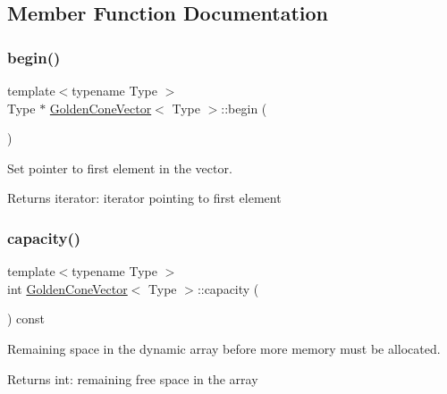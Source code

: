 \subsection{Member Function Documentation}
\mbox{\label{class_golden_cone_vector_aeb123e6db4c356b66754ee6e2e813935}} 
\subsubsection{\texorpdfstring{begin()}{begin()}}
{\footnotesize\ttfamily template$<$typename Type $>$ \\
Type $\ast$ \mbox{\hyperlink{class_golden_cone_vector}{Golden\+Cone\+Vector}}$<$ Type $>$\+::begin (\begin{DoxyParamCaption}{ }\end{DoxyParamCaption})}



Set pointer to first element in the vector. 

\begin{DoxyReturn}{Returns}
iterator\+: iterator pointing to first element 
\end{DoxyReturn}
\mbox{\label{class_golden_cone_vector_a127f86a04525d935c183195330a85780}} 
\subsubsection{\texorpdfstring{capacity()}{capacity()}}
{\footnotesize\ttfamily template$<$typename Type $>$ \\
int \mbox{\hyperlink{class_golden_cone_vector}{Golden\+Cone\+Vector}}$<$ Type $>$\+::capacity (\begin{DoxyParamCaption}{ }\end{DoxyParamCaption}) const}



Remaining space in the dynamic array before more memory must be allocated. 

\begin{DoxyReturn}{Returns}
int\+: remaining free space in the array 
\end{DoxyReturn}
\mbox{\label{class_golden_cone_vector_af926598b3e8242f1c7f5241383f3c566}} 
